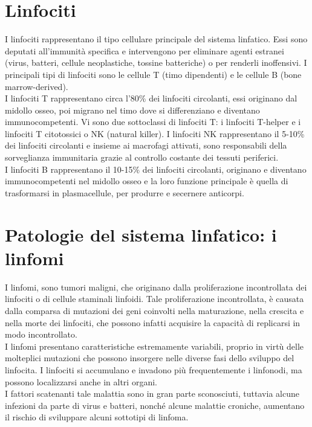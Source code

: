 \section{Linfociti}
I linfociti rappresentano il tipo cellulare principale del sistema linfatico. 
Essi sono deputati all'immunità specifica e intervengono per eliminare agenti estranei 
(virus, batteri, cellule neoplastiche, tossine batteriche) o per renderli inoffensivi. 
I principali tipi di linfociti sono le cellule T (timo dipendenti) e le cellule B (bone marrow-derived)\cite{BOOK2}.\\
I linfociti T rappresentano circa l’80\% dei linfociti circolanti, essi originano dal midollo osseo, 
poi migrano nel timo dove si differenziano e diventano immunocompetenti. 
Vi sono due sottoclassi di linfociti T: i linfociti T-helper e i linfociti T citotossici o NK (natural killer). 
I linfociti NK rappresentano il 5-10\% dei linfociti circolanti e insieme ai macrofagi attivati, 
sono responsabili della sorveglianza immunitaria grazie al controllo costante dei tessuti periferici.\\
I linfociti B rappresentano il 10-15\% dei linfociti circolanti, originano e diventano immunocompetenti 
nel midollo osseo e la loro funzione principale è quella di trasformarsi in plasmacellule, 
per produrre e secernere anticorpi\cite{BOOK2}.\\   

\section{Patologie del sistema linfatico: i linfomi}
I linfomi, sono tumori maligni, che originano dalla proliferazione incontrollata dei linfociti o di cellule staminali 
linfoidi. Tale proliferazione incontrollata, è causata dalla comparsa di mutazioni dei geni coinvolti 
nella maturazione, nella crescita e nella morte dei linfociti, 
che possono infatti acquisire la capacità di replicarsi in modo incontrollato\cite{LINFOMIAIL}.\\ 
I linfomi presentano caratteristiche estremamente variabili, proprio in virtù delle molteplici mutazioni 
che possono insorgere nelle diverse fasi dello sviluppo del linfocita. 
I linfociti si accumulano e invadono più frequentemente i linfonodi, ma possono localizzarsi anche in altri organi.\\

I fattori scatenanti tale malattia sono in gran parte sconosciuti, tuttavia alcune infezioni da parte di virus e 
batteri, nonché alcune malattie croniche, aumentano il rischio di sviluppare alcuni sottotipi di linfoma\cite{LINFOMIAIL}.\\

